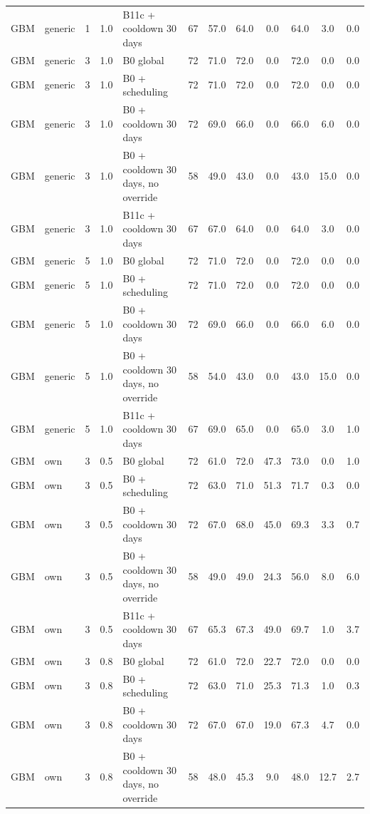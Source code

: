 \begin{longtable}{lllllccccccc}
GBM & generic & 1 & 1.0 & B11c + cooldown 30 days & 67 & 57.0 & 64.0 & 0.0 & 64.0 & 3.0 & 0.0 \\
GBM & generic & 3 & 1.0 & B0 global & 72 & 71.0 & 72.0 & 0.0 & 72.0 & 0.0 & 0.0 \\
GBM & generic & 3 & 1.0 & B0 + scheduling & 72 & 71.0 & 72.0 & 0.0 & 72.0 & 0.0 & 0.0 \\
GBM & generic & 3 & 1.0 & B0 + cooldown 30 days & 72 & 69.0 & 66.0 & 0.0 & 66.0 & 6.0 & 0.0 \\
GBM & generic & 3 & 1.0 & B0 + cooldown 30 days, no override & 58 & 49.0 & 43.0 & 0.0 & 43.0 & 15.0 & 0.0 \\
GBM & generic & 3 & 1.0 & B11c + cooldown 30 days & 67 & 67.0 & 64.0 & 0.0 & 64.0 & 3.0 & 0.0 \\
GBM & generic & 5 & 1.0 & B0 global & 72 & 71.0 & 72.0 & 0.0 & 72.0 & 0.0 & 0.0 \\
GBM & generic & 5 & 1.0 & B0 + scheduling & 72 & 71.0 & 72.0 & 0.0 & 72.0 & 0.0 & 0.0 \\
GBM & generic & 5 & 1.0 & B0 + cooldown 30 days & 72 & 69.0 & 66.0 & 0.0 & 66.0 & 6.0 & 0.0 \\
GBM & generic & 5 & 1.0 & B0 + cooldown 30 days, no override & 58 & 54.0 & 43.0 & 0.0 & 43.0 & 15.0 & 0.0 \\
GBM & generic & 5 & 1.0 & B11c + cooldown 30 days & 67 & 69.0 & 65.0 & 0.0 & 65.0 & 3.0 & 1.0 \\
GBM & own & 3 & 0.5 & B0 global & 72 & 61.0 & 72.0 & 47.3 & 73.0 & 0.0 & 1.0 \\
GBM & own & 3 & 0.5 & B0 + scheduling & 72 & 63.0 & 71.0 & 51.3 & 71.7 & 0.3 & 0.0 \\
GBM & own & 3 & 0.5 & B0 + cooldown 30 days & 72 & 67.0 & 68.0 & 45.0 & 69.3 & 3.3 & 0.7 \\
GBM & own & 3 & 0.5 & B0 + cooldown 30 days, no override & 58 & 49.0 & 49.0 & 24.3 & 56.0 & 8.0 & 6.0 \\
GBM & own & 3 & 0.5 & B11c + cooldown 30 days & 67 & 65.3 & 67.3 & 49.0 & 69.7 & 1.0 & 3.7 \\
GBM & own & 3 & 0.8 & B0 global & 72 & 61.0 & 72.0 & 22.7 & 72.0 & 0.0 & 0.0 \\
GBM & own & 3 & 0.8 & B0 + scheduling & 72 & 63.0 & 71.0 & 25.3 & 71.3 & 1.0 & 0.3 \\
GBM & own & 3 & 0.8 & B0 + cooldown 30 days & 72 & 67.0 & 67.0 & 19.0 & 67.3 & 4.7 & 0.0 \\
GBM & own & 3 & 0.8 & B0 + cooldown 30 days, no override & 58 & 48.0 & 45.3 & 9.0 & 48.0 & 12.7 & 2.7 \\

\end{longtable}
